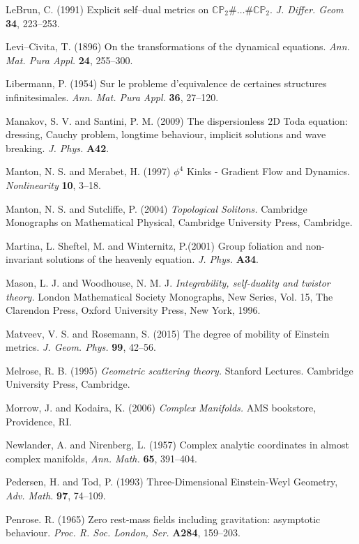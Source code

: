 \begin{thebibliography}{}
 LeBrun, C. (1991)
Explicit self--dual metrics on $\mathbb{CP}_2\#\dots \#\mathbb{CP}_2$.
\textit{J. Differ. Geom} {\bf 34}, 223--253.


 Levi--Civita, T. (1896) On the transformations of the 
dynamical equations. \textit{Ann. Mat. Pura Appl.} {\bf 24}, 255--300.

Libermann, P. (1954) Sur le probleme d'equivalence de certaines structures infinitesimales. \textit{Ann.
Mat. Pura Appl.} {\bf 36}, 27--120.

 Manakov, S. V. and Santini, P. M. (2009)
The dispersionless 2D Toda equation: dressing, Cauchy problem, longtime behaviour, implicit solutions and wave breaking. \textit{J. Phys.} {\bf A42}.

 Manton, N. S. and Merabet, H. (1997)
$\phi^4$ Kinks - Gradient Flow and Dynamics. \textit{Nonlinearity} {\bf 10}, 3--18.

 Manton, N. S. and Sutcliffe, P. (2004)
\textit{Topological Solitons.} Cambridge Monographs on Mathematical Physical, Cambridge University Press, Cambridge.

Martina, L. Sheftel, M. and Winternitz, P.(2001)
Group foliation and non-invariant
solutions of the heavenly equation.
\textit{J. Phys.} {\bf A34}.

 Mason, L. J. and Woodhouse, N. M. J.  \textit{Integrability, self-duality and twistor theory.} London Mathematical Society Monographs, New Series, Vol. 15, The Clarendon Press, Oxford University Press, New York, 1996.

 Matveev, V. S. and Rosemann, S. (2015)
The degree of mobility of Einstein metrics. \textit{J. Geom. Phys.}
{\bf 99}, 42--56.


Melrose, R. B. (1995)
{\em Geometric scattering theory.} Stanford Lectures. Cambridge University Press,
Cambridge.

 Morrow, J. and Kodaira, K. (2006)
\textit{Complex Manifolds.} AMS bookstore, Providence, RI.

 Newlander, A. and Nirenberg, L. (1957)
Complex analytic coordinates in almost complex manifolds, \textit{Ann. Math.} {\bf 65}, 391--404.

 Pedersen, H. and Tod, P. (1993)
Three-Dimensional Einstein-Weyl Geometry,
\textit{Adv. Math.} {\bf 97}, 74--109.

Penrose. R. (1965) Zero rest-mass fields including gravitation: asymptotic behaviour. \textit{Proc. R. 
Soc. London, Ser.} {\bf A284}, 159--203.


\end{thebibliography}
